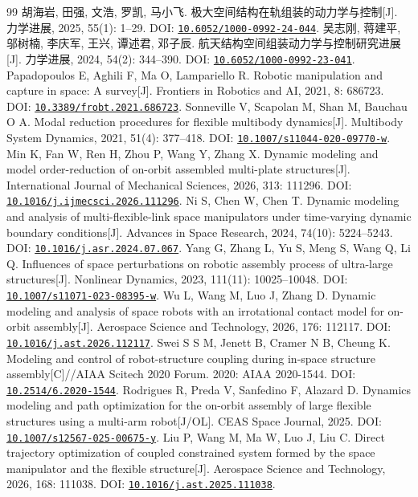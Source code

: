 \documentclass[UTF8,a4paper,zihao=-4,fontset=fandol]{ctexart}
\newcommand{\doi}[1]{\href{https://doi.org/#1}{\nolinkurl{#1}}}
\begin{document}
\renewcommand{\refname}{主要参考文献}
\begin{thebibliography}{99}
\setlength{\itemsep}{0.3em}
 胡海岩, 田强, 文浩, 罗凯, 马小飞. 极大空间结构在轨组装的动力学与控制[J]. 力学进展, 2025, 55(1): 1--29. DOI: \doi{10.6052/1000-0992-24-044}.
 吴志刚, 蒋建平, 邬树楠, 李庆军, 王兴, 谭述君, 邓子辰. 航天结构空间组装动力学与控制研究进展[J]. 力学进展, 2024, 54(2): 344--390. DOI: \doi{10.6052/1000-0992-23-041}.
 Papadopoulos E, Aghili F, Ma O, Lampariello R. Robotic manipulation and capture in space: A survey[J]. Frontiers in Robotics and AI, 2021, 8: 686723. DOI: \doi{10.3389/frobt.2021.686723}.
 Sonneville V, Scapolan M, Shan M, Bauchau O A. Modal reduction procedures for flexible multibody dynamics[J]. Multibody System Dynamics, 2021, 51(4): 377--418. DOI: \doi{10.1007/s11044-020-09770-w}.
 Min K, Fan W, Ren H, Zhou P, Wang Y, Zhang X. Dynamic modeling and model order-reduction of on-orbit assembled multi-plate structures[J]. International Journal of Mechanical Sciences, 2026, 313: 111296. DOI: \doi{10.1016/j.ijmecsci.2026.111296}.
 Ni S, Chen W, Chen T. Dynamic modeling and analysis of multi-flexible-link space manipulators under time-varying dynamic boundary conditions[J]. Advances in Space Research, 2024, 74(10): 5224--5243. DOI: \doi{10.1016/j.asr.2024.07.067}.
 Yang G, Zhang L, Yu S, Meng S, Wang Q, Li Q. Influences of space perturbations on robotic assembly process of ultra-large structures[J]. Nonlinear Dynamics, 2023, 111(11): 10025--10048. DOI: \doi{10.1007/s11071-023-08395-w}.
 Wu L, Wang M, Luo J, Zhang D. Dynamic modeling and analysis of space robots with an irrotational contact model for on-orbit assembly[J]. Aerospace Science and Technology, 2026, 176: 112117. DOI: \doi{10.1016/j.ast.2026.112117}.
 Swei S S M, Jenett B, Cramer N B, Cheung K. Modeling and control of robot-structure coupling during in-space structure assembly[C]//AIAA Scitech 2020 Forum. 2020: AIAA 2020-1544. DOI: \doi{10.2514/6.2020-1544}.
 Rodrigues R, Preda V, Sanfedino F, Alazard D. Dynamics modeling and path optimization for the on-orbit assembly of large flexible structures using a multi-arm robot[J/OL]. CEAS Space Journal, 2025. DOI: \doi{10.1007/s12567-025-00675-y}.
 Liu P, Wang M, Ma W, Luo J, Liu C. Direct trajectory optimization of coupled constrained system formed by the space manipulator and the flexible structure[J]. Aerospace Science and Technology, 2026, 168: 111038. DOI: \doi{10.1016/j.ast.2025.111038}.

\end{thebibliography}
\end{document}
